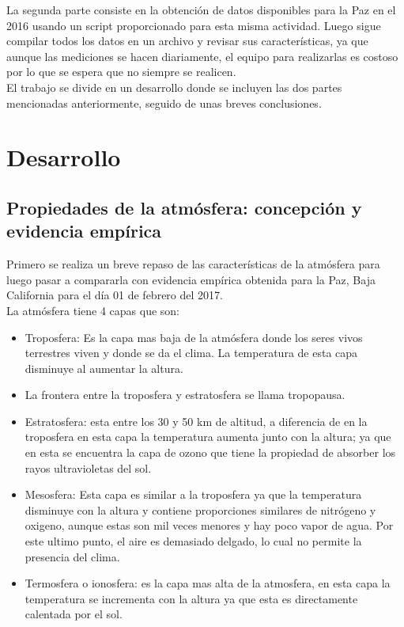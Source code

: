 \documentclass[12pt,letterpaper]{article}
\begin{document}
La segunda parte consiste en la obtención de datos disponibles para la Paz en el 2016 usando un script proporcionado para esta misma actividad. Luego sigue compilar todos los datos en un archivo y revisar sus características, ya que aunque las mediciones se hacen diariamente, el equipo para realizarlas es costoso por lo que se espera que no siempre se realicen.\\

El trabajo se divide en un desarrollo donde se incluyen las dos partes mencionadas anteriormente, seguido de unas breves conclusiones.\\


\section{Desarrollo}


\subsection{Propiedades de la atmósfera: concepción y evidencia empírica}

Primero se realiza un breve repaso de las características de la atmósfera para luego pasar a compararla con evidencia empírica obtenida para la Paz, Baja California para el día 01 de febrero del 2017. \\

La atmósfera tiene 4 capas que son\cite{a}:

\begin{itemize}
\item Troposfera: Es la capa mas baja de la atmósfera donde los seres vivos terrestres viven y donde se da el clima. La temperatura de esta capa disminuye al aumentar la altura. 
\item La frontera entre la troposfera y estratosfera se llama tropopausa. 
\item Estratosfera: esta entre los 30 y 50 km de altitud, a diferencia de en la troposfera en esta capa la temperatura aumenta junto con la altura; ya que en esta se encuentra la capa de ozono que tiene la propiedad de absorber los rayos ultravioletas del sol.
\item Mesosfera: Esta capa es similar a la troposfera ya que la temperatura disminuye con la altura y contiene proporciones similares de nitrógeno y oxigeno, aunque estas son mil veces menores y hay poco vapor de agua. Por este ultimo punto, el aire es demasiado delgado, lo cual no permite la presencia del clima.
\item  Termosfera o ionosfera: es la capa mas alta de la atmosfera, en esta capa la temperatura se incrementa con la altura ya que esta es directamente calentada por el sol.
\end{itemize}
\end{document}
